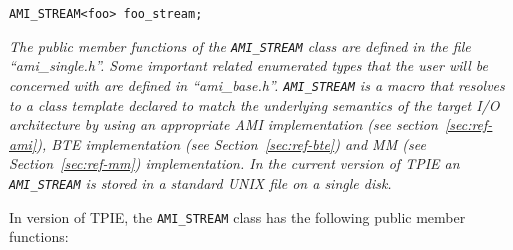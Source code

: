 \begin{verbatim}
AMI_STREAM<foo> foo_stream;
\end{verbatim}

{\em The public member functions of the \verb|AMI_STREAM|
   class are defined in the file ``ami\_single.h''. Some
   important related enumerated types that the user will be
   concerned with are defined in ``ami\_base.h''.
   \verb|AMI_STREAM| is a macro that resolves to a class
   template declared to match the underlying semantics of
   the target I/O architecture by using an appropriate AMI
   implementation (see section~\ref{sec:ref-ami}), BTE
   implementation (see
   Section~\ref{sec:ref-bte}) and MM (see
   Section~\ref{sec:ref-mm}) implementation. In the current
   version of TPIE an \verb|AMI_STREAM| is stored in a
   standard UNIX file on a single disk.}

In version \version of TPIE,  the \verb|AMI_STREAM| class has the
following public member functions:


